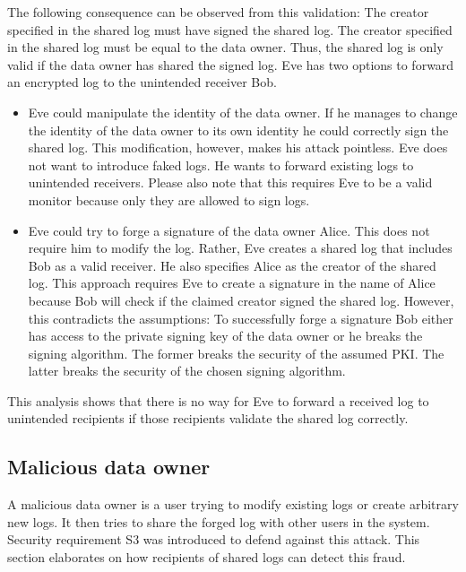 \documentclass[../main.tex]{subfiles}
\begin{document}
The following consequence can be observed from this validation:
The creator specified in the shared log must have signed the shared log.
The creator specified in the shared log must be equal to the data owner.
Thus, the shared log is only valid if the data owner has shared the signed log.
Eve has two options to forward an encrypted log to the unintended receiver Bob. 
\begin{itemize}
    \item 
    Eve could manipulate the identity of the data owner.
    If he manages to change the identity of the data owner to its own identity he could correctly sign the shared log.
    This modification, however, makes his attack pointless.
    Eve does not want to introduce faked logs.
    He wants to forward existing logs to unintended receivers.
    Please also note that this requires Eve to be a valid monitor because only they are allowed to sign logs.
    \item 
    Eve could try to forge a signature of the data owner Alice.
    This does not require him to modify the log.
    Rather, Eve creates a shared log that includes Bob as a valid receiver.
    He also specifies Alice as the creator of the shared log.
    This approach requires Eve to create a signature in the name of Alice because Bob will check if the claimed creator signed the shared log.
    However, this contradicts the assumptions:
    To successfully forge a signature Bob either has access to the private signing key of the data owner or he breaks the signing algorithm.
    The former breaks the security of the assumed PKI.
    The latter breaks the security of the chosen signing algorithm.
\end{itemize}

This analysis shows that there is no way for Eve to forward a received log to unintended recipients if those recipients validate the shared log correctly.


\subsection{Malicious data owner}
A malicious data owner is a user trying to modify existing logs or create arbitrary new logs.
It then tries to share the forged log with other users in the system.
Security requirement S3 was introduced to defend against this attack.
This section elaborates on how recipients of shared logs can detect this fraud.
\end{document}
